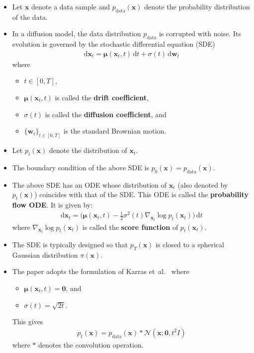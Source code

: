 \documentclass[10pt]{article}
\newcommand{\dee}{\mathrm{d}}
\newcommand{\ve}[1]{\mathbf{#1}}
\newcommand{\ves}[1]{\boldsymbol{#1}}
\newcommand{\etal}{{et~al.}}
\newcommand{\mcal}[1]{\mathcal{#1}}
\newcommand{\data}{\mathrm{data}}
\begin{document}
\begin{itemize}
  \item Let $\ve{x}$ denote a data sample and $p_{\data}(\ve{x})$ denote the probability distribution of the data.
  
  \item In a diffusion model, the data distribution $p_{\data}$ is corrupted with noise. Its evolution is governed by the stochastic differential equation (SDE)
  \begin{align}
    \dee \ve{x}_t = \ves{\mu}(\ve{x}_t,t)\, \dee t + \sigma(t)\, \dee\ve{w}_t \label{eqn:probability-flow-ode}
  \end{align}
  where
  \begin{itemize}
    \item $t \in [0,T]$,
    \item $\ves{\mu}(\ve{x}_t, t)$ is called the {\bf drift coefficient},
    \item $\sigma(t)$ is called the {\bf diffusion coefficient}, and
    \item $\{ \ve{w}_t \}_{t \in [0,T]}$ is the standard Brownian motion.
  \end{itemize}

  \item Let $p_t(\ve{x})$ denote the distribution of $\ve{x}_t$.
  
  \item The boundary condition of the above SDE is $p_0(\ve{x}) = p_{\data}(\ve{x})$.

  \item The above SDE has an ODE whose distribution of $\ve{x}_t$ (also denoted by $p_t(\ve{x})$) coincides with that of the SDE. This ODE is called the {\bf probability flow ODE}. It is given by:
  \begin{align*}
    \dee\ve{x}_t = \bigg( \ves{\mu}(\ve{x}_t, t) - \frac{1}{2} \sigma^2(t) \nabla_{\ve{x}_t} \log p_t(\ve{x}_t) \bigg)\, \dee t
  \end{align*}
  where $\nabla_{\ve{x}_t} \log p_t(\ve{x}_t)$ is called the {\bf score function} of $p_t(\ve{x}_t)$.

  \item The SDE is typically designed so that $p_T(\ve{x})$ is closed to a spherical Gaussian distribution $\pi(\ve{x})$.
  
  \item The paper adopts the formulation of Karras \etal~\cite{Karras:2022} where
  \begin{itemize}
    \item $\ves{\mu}(\ve{x}_t,t) = \ve{0}$, and
    \item $\sigma(t) = \sqrt{2t}$.
  \end{itemize}
  This gives
  \begin{align*}
    p_t(\ve{x}) = p_{\data}(\ve{x}) * \mcal{N}(\ve{x}; \ve{0}, t^2I)
  \end{align*}
  where $*$ denotes the convolution operation.


\end{itemize}
\end{document}
